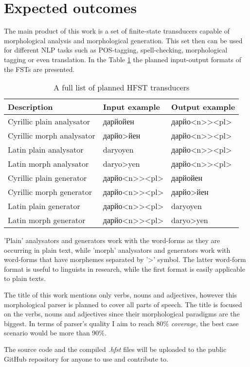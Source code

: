 \section{Expected outcomes}
\par The main product of this work is a set of finite-state transducers capable of morphological analysis and morphological generation. This set then can be used for different NLP tasks such as POS-tagging, spell-checking, morphological tagging or even translation. In the Table \hyperref[Tab:format]{1} the planned input-output formats of the FSTs are presented.
\begin{table}[!h]
    \begin{center}
        \begin{tabular}{|l|l|l|} 
            \hline
            Description & Input example & Output example \\
            \hline
            \hline
            Cyrillic plain analysator & дарйойен & дарйо<n>{}><pl> \\
            \hline
            Cyrillic morph analysator & дарйо>йен & дарйо<n>{}><pl> \\
            \hline
            Latin plain analysator & daryoyen & дарйо<n>{}><pl> \\
            \hline
            Latin morph analysator & daryo>yen & дарйо<n>{}><pl> \\
            \hline
            Cyrillic plain generator & дарйо<n>{}><pl> & дарйойен \\
            \hline
            Cyrillic morph generator & дарйо<n>{}><pl> & дарйо>йен \\
            \hline
            Latin plain generator & дарйо<n>{}><pl> & daryoyen \\
            \hline
            Latin morph generator & дарйо<n>{}><pl> & daryo>yen \\
            \hline
        \end{tabular}
        \label{Tab:format}
        \caption{A full list of planned HFST transducers}
    \end{center}
\end{table}
'Plain' analysators and generators work with the word-forms as they are occurring in plain text, while 'morph' analysators and generators work with word-forms that have morphemes separated by '>' symbol. The latter word-form format is useful to linguists in research, while the first format is easily applicable to plain texts.
\par The title of this work mentions only verbs, nouns and adjectives, however this morphological parser is planned to cover all parts of speech. The title is focused on the verbs, nouns and adjectives since their morphological paradigms are the biggest. In terms of parser's quality I aim to reach 80\% \textit{coverage}, the best case scenario would be more than 90\%. 
\par The source code and the compiled \textit{.hfst} files will be uploaded to the public GitHub repository for anyone to use and contribute to.